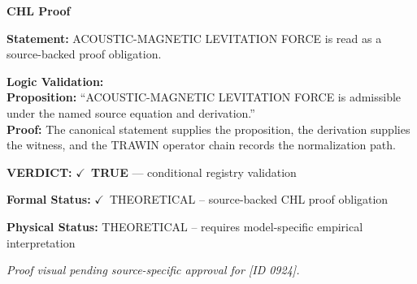 \vspace{0.45em}
\noindent\textbf{CHL Proof}\par
\textbf{Statement:} ACOUSTIC-MAGNETIC LEVITATION FORCE is read as a source-backed proof obligation.

\textbf{Logic Validation:}\\
\textbf{Proposition:} ``ACOUSTIC-MAGNETIC LEVITATION FORCE is admissible under the named source equation and derivation.''\\
\textbf{Proof:} The canonical statement supplies the proposition, the derivation supplies the witness, and the TRAWIN operator chain records the normalization path.

\textbf{VERDICT:} \ensuremath{\checkmark}\ \textbf{TRUE} --- conditional registry validation

\textbf{Formal Status:} \ensuremath{\checkmark}\ THEORETICAL -- source-backed CHL proof obligation

\textbf{Physical Status:} THEORETICAL -- requires model-specific empirical interpretation
\par\vspace{0.45em}
\par
\vfill
\begingroup\footnotesize\itshape
Proof visual pending source-specific approval for [ID 0924].
\par\endgroup
\vfill
\endgroup
\endgroup
